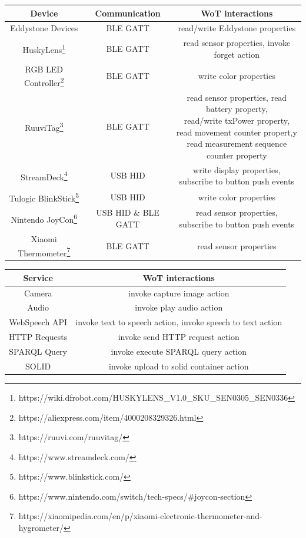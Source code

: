 \documentclass[runningheads]{llncs}
\begin{document}
\begin{center}
  \begin{tabular}{|c|c|c|}
  \hline
  Device & Communication & WoT interactions \\
  \hline
  Eddystone Devices & BLE GATT & read/write Eddystone properties \\
  HuskyLens\footnote{https://wiki.dfrobot.com/HUSKYLENS\_V1.0\_SKU\_SEN0305\_SEN0336} & BLE GATT & read sensor properties, invoke forget action \\
  RGB LED Controller\footnote{https://aliexpress.com/item/4000208329326.html} & BLE GATT & write color properties \\
  RuuviTag\footnote{https://ruuvi.com/ruuvitag/} & BLE GATT & \makecell{read sensor properties, read battery property, \\
  read/write txPower property, \\
  read movement counter propert,y \\
  read measurement sequence counter property} \\
  StreamDeck\footnote{https://www.streamdeck.com/} & USB HID & \makecell{write display properties, \\ subscribe to button push events} \\
  Tulogic BlinkStick\footnote{https://www.blinkstick.com/} & USB HID & write color properties \\ 
  Nintendo JoyCon\footnote{https://www.nintendo.com/switch/tech-specs/\#joycon-section} & USB HID \& BLE GATT & \makecell{read sensor properties,\\ subscribe to button push events} \\
  Xiaomi Thermometer\footnote{https://xiaomipedia.com/en/p/xiaomi-electronic-thermometer-and-hygrometer/} & BLE GATT & read sensor properties \\
  \hline
  \end{tabular}

  \begin{tabular}{|c|c|}
  \hline
  Service & WoT interactions \\
  \hline
  Camera & invoke capture image action \\
  Audio & invoke play audio action \\ %
  WebSpeech API & invoke text to speech action, invoke speech to text action \\
  HTTP Requests & invoke send HTTP request action \\
  SPARQL Query & invoke execute SPARQL query action \\
  SOLID & invoke upload to solid container action \\
  \hline
  \end{tabular}
\end{center}
\end{document}
